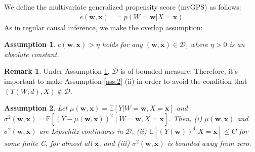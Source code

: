 \documentclass[11pt]{article}
\numberwithin{equation}{section}
\newtheorem{assumption}{Assumption}[section]
\theoremstyle{definition}
\newtheorem{remark}{Remark}[section]
\begin{document}
We define the multivariate generalized propensity score (mvGPS) as follows:
\begin{align}
    e(\mathbf{w},\mathbf{x}) &= p(W=\mathbf{w}|X=\mathbf{x})
\end{align}
As in regular causal inference, we make the overlap assumption:

\begin{assumption}\label{ass:3}
$e(\mathbf{w},\mathbf{x})>\eta$ holds for any $(\mathbf{w},\mathbf{x}) \in \mathcal{D}$, where $\eta>0$ is an absolute constant.
\end{assumption}

\begin{remark} 
Under Assumption \ref{ass:3}, $\mathcal{D}$ is of bounded measure. Therefore, it's important to make Assumption \ref{ass:2} (ii) in order to avoid the condition that $(T(W;d),X) \notin \mathcal{D}$.
\end{remark}

\begin{assumption} \label{ass:4}
Let $\mu(\mathbf{w},\mathbf{x})=\mathbb{E}\left[Y|W=\mathbf{w}, X=\mathbf{x}\right]$  and  $\sigma^{2}(\mathbf{w},\mathbf{x})=\mathbb{E}\left[\left(Y-\mu(\mathbf{w},\mathbf{x})\right)^{2} \mid W=\mathbf{w} ,X=\mathbf{x}\right]$. Then, (i) $\mu(\mathbf{w},\mathbf{x})$  and  $\sigma^{2}(\mathbf{w},\mathbf{x})$ are Lipschitz continuous in $\mathcal{D}$, (ii)  $\mathbb{E}[(Y(\mathbf{w}))^{4}|X=\mathbf{x}] \leq C$  for some finite  C, for almost all $\mathbf{x}$, and (iii)  $\sigma^{2}(\mathbf{w},\mathbf{x})$  is bounded away from zero.
\end{assumption}
\end{document}
